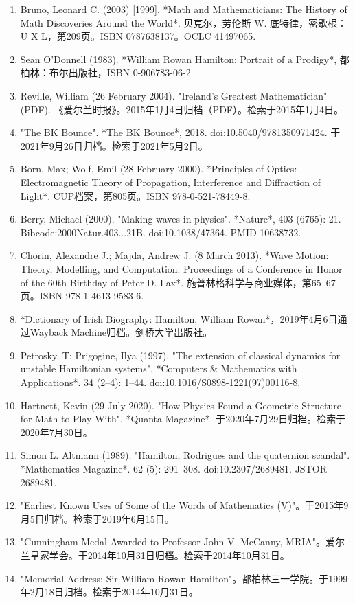 \begin{enumerate}
\item Bruno, Leonard C. (2003) [1999]. *Math and Mathematicians: The History of Math Discoveries Around the World*. 贝克尔，劳伦斯 W. 底特律，密歇根：U X L，第209页。ISBN 0787638137。OCLC 41497065.  
\item Sean O’Donnell (1983). *William Rowan Hamilton: Portrait of a Prodigy*, 都柏林：布尔出版社，ISBN 0-906783-06-2  
\item Reville, William (26 February 2004). "Ireland's Greatest Mathematician" (PDF). 《爱尔兰时报》。2015年1月4日归档（PDF）。检索于2015年1月4日。  
\item "The BK Bounce". *The BK Bounce*, 2018. doi:10.5040/9781350971424. 于2021年9月26日归档。检索于2021年5月2日。  
\item Born, Max; Wolf, Emil (28 February 2000). *Principles of Optics: Electromagnetic Theory of Propagation, Interference and Diffraction of Light*. CUP档案，第805页。ISBN 978-0-521-78449-8.  
\item Berry, Michael (2000). "Making waves in physics". *Nature*, 403 (6765): 21. Bibcode:2000Natur.403...21B. doi:10.1038/47364. PMID 10638732.  
\item Chorin, Alexandre J.; Majda, Andrew J. (8 March 2013). *Wave Motion: Theory, Modelling, and Computation: Proceedings of a Conference in Honor of the 60th Birthday of Peter D. Lax*. 施普林格科学与商业媒体，第65–67页。ISBN 978-1-4613-9583-6.  
\item *Dictionary of Irish Biography: Hamilton, William Rowan*，2019年4月6日通过Wayback Machine归档。剑桥大学出版社。  
\item Petrosky, T; Prigogine, Ilya (1997). "The extension of classical dynamics for unstable Hamiltonian systems". *Computers & Mathematics with Applications*. 34 (2–4): 1–44. doi:10.1016/S0898-1221(97)00116-8.  
\item Hartnett, Kevin (29 July 2020). "How Physics Found a Geometric Structure for Math to Play With". *Quanta Magazine*. 于2020年7月29日归档。检索于2020年7月30日。  
\item Simon L. Altmann (1989). "Hamilton, Rodrigues and the quaternion scandal". *Mathematics Magazine*. 62 (5): 291–308. doi:10.2307/2689481. JSTOR 2689481.  
\item "Earliest Known Uses of Some of the Words of Mathematics (V)"。于2015年9月5日归档。检索于2019年6月15日。  
\item "Cunningham Medal Awarded to Professor John V. McCanny, MRIA"。爱尔兰皇家学会。于2014年10月31日归档。检索于2014年10月31日。  
\item "Memorial Address: Sir William Rowan Hamilton"。都柏林三一学院。于1999年2月18日归档。检索于2014年10月31日。

\end{enumerate}
